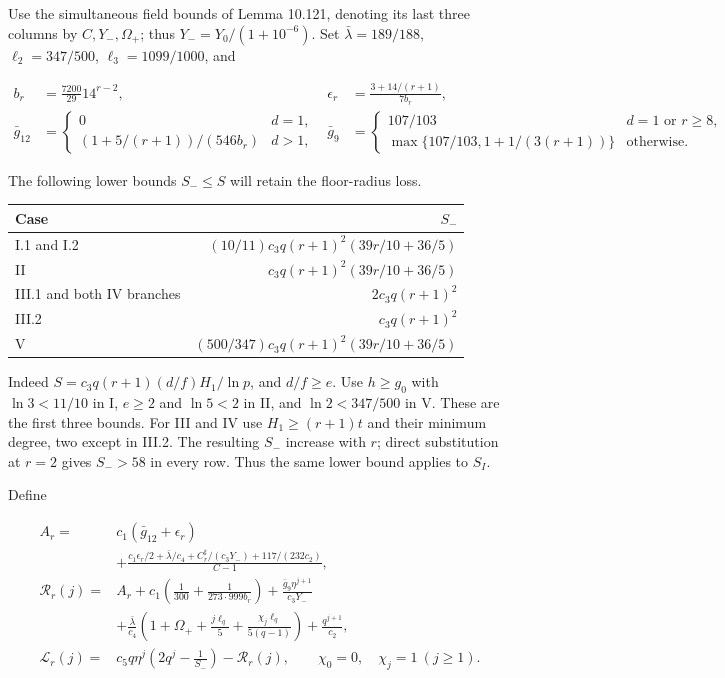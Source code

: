 \documentclass[
  11pt,
  a4paper,
]{article}
\newcounter{none} %
\begin{document}
Use the simultaneous field bounds of Lemma 10.121, denoting its last
three columns by \(C,Y_-,\Omega_+\); thus \(Y_-=Y_0/(1+10^{-6})\). Set
\(\bar\lambda=189/188\), \(\ell_2=347/500\), \(\ell_3=1099/1000\), and

\[
\begin{aligned}
b_r&=\frac{7200}{29}14^{r-2},&
\epsilon_r&=\frac{3+14/(r+1)}{7b_r},\\
\bar g_{12}&=\begin{cases}0&d=1,\\(1+5/(r+1))/(546b_r)&d>1,\end{cases}&
\bar g_9&=\begin{cases}107/103&d=1\text{ or }r\ge8,\\
\max\{107/103,1+1/(3(r+1))\}&\text{otherwise}.\end{cases}
\end{aligned}
\tag{10.331}
\]

The following lower bounds \(S_-\le S\) will retain the floor-radius
loss.

{\def\LTcaptype{none} %
\begin{longtable}[]{@{}lr@{}}
\toprule\noalign{}
Case & \(S_-\) \\
\midrule\noalign{}
\endhead
\bottomrule\noalign{}
\endlastfoot
I.1 and I.2 & \((10/11)c_3q(r+1)^2(39r/10+36/5)\) \\
II & \(c_3q(r+1)^2(39r/10+36/5)\) \\
III.1 and both IV branches & \(2c_3q(r+1)^2\) \\
III.2 & \(c_3q(r+1)^2\) \\
V & \((500/347)c_3q(r+1)^2(39r/10+36/5)\) \\
\end{longtable}
}

Indeed \(S=c_3q(r+1)(d/f)H_1/\ln p\), and \(d/f\ge e\). Use \(h\ge g_0\)
with \(\ln3<11/10\) in I, \(e\ge2\) and \(\ln5<2\) in II, and
\(\ln2<347/500\) in V. These are the first three bounds. For III and IV
use \(H_1\ge(r+1)t\) and their minimum degree, two except in III.2. The
resulting \(S_-\) increase with \(r\); direct substitution at \(r=2\)
gives \(S_->58\) in every row. Thus the same lower bound applies to
\(S_I\).

Define

\[
\begin{aligned}
A_r={}&c_1(\bar g_{12}+\epsilon_r)\\
&+\frac{c_1\epsilon_r/2+\bar\lambda/c_4+
C_r^{\sharp}/(c_3Y_-)+117/(232c_2)}{C-1},\\
\mathcal R_r(j)={}&A_r+
c_1\left(\frac1{300}+\frac1{273\cdot999b_r}\right)
+\frac{\bar g_9\eta^{j+1}}{c_3Y_-}\\
&+\frac{\bar\lambda}{c_4}
\left(1+\Omega_++\frac{j\ell_q}{5}
 +\frac{\chi_j\ell_q}{5(q-1)}\right)
 +\frac{q^{j+1}}{c_2},\\
\mathcal L_r(j)={}&c_5q\eta^j\left(2q^j-\frac1{S_-}\right)
 -\mathcal R_r(j),
\qquad \chi_0=0,\quad\chi_j=1\ (j\ge1).
\end{aligned}
\tag{10.332}
\]
\end{document}
